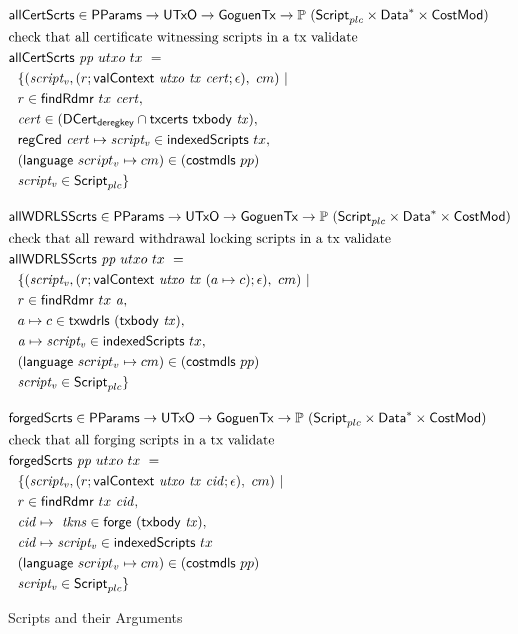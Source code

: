 \begin{figure}[htb]
  \begin{align*}
    & \fun{allCertScrts} \in \PParams \to \UTxO \to \GoguenTx \to \powerset{(\ScriptPlutus \times \seqof{\Data} \times \CostMod)} \\
    & \text{check that all certificate witnessing scripts in a tx validate} \\
    & \fun{allCertScrts}~\var{pp}~{utxo}~{tx}~=~ \\
    & ~~\{ (\var{script_v}, (r;
    \fun{valContext}~\var{utxo}~\var{tx}~\var{cert}; \epsilon),~cm) ~\vert \\
    & ~~r \in \fun{findRdmr}~{tx}~\var{cert}, \\
    & ~~\var{cert} \in (\DCertDeRegKey\cap\fun{txcerts}~\txbody{tx}), \\
    &~~\fun{regCred}~\var{cert}\mapsto \var{script_v}\in \fun{indexedScripts}~{tx}, \\
    &~~(\fun{language}~{script_v} \mapsto cm)\in(\fun{costmdls}~{pp}) \\
    & ~~\var{script_v} \in \ScriptPlutus
     \}
    \nextdef
    & \fun{allWDRLSScrts} \in \PParams \to \UTxO \to \GoguenTx \to \powerset{(\ScriptPlutus\times\seqof{\Data} \times \CostMod)} \\
    & \text{check that all reward withdrawal locking scripts in a tx validate} \\
    & \fun{allWDRLSScrts}~\var{pp}~{utxo}~{tx}~=~ \\
    & ~~\{ (\var{script_v}, (r; \fun{valContext}~\var{utxo}~\var{tx}~
      (a\mapsto c); \epsilon),~cm) ~\vert \\
    &~~ r\in \fun{findRdmr}~{tx}~\var{a}, \\
    & ~~a \mapsto c \in\fun{txwdrls}~(\txbody{tx}), \\
    & ~~\var{a}\mapsto \var{script_v}\in \fun{indexedScripts}~{tx}, \\
    &~~(\fun{language}~{script_v} \mapsto cm)\in(\fun{costmdls}~{pp}) \\
    & ~~ \var{script_v} \in \ScriptPlutus \}
    \nextdef
    & \fun{forgedScrts} \in \PParams \to \UTxO \to \GoguenTx \to \powerset{(\ScriptPlutus\times\seqof{\Data} \times \CostMod)} \\
    & \text{check that all forging scripts in a tx validate} \\
    & \fun{forgedScrts}~\var{pp}~{utxo}~{tx}~=~\\
    & ~~\{ (\var{script_v}, (r;
    \fun{valContext}~\var{utxo}~\var{tx}~\var{cid}; \epsilon),~cm) ~\vert \\
    & ~~r \in \fun{findRdmr}~{tx}~\var{cid}, \\
    & ~~\var{cid}\mapsto ~ \var{tkns} \in \fun{forge}~(\txbody{tx}), \\
    &~~\var{cid}\mapsto \var{script_v}\in \fun{indexedScripts}~{tx} \\
    &~~(\fun{language}~{script_v} \mapsto cm)\in(\fun{costmdls}~{pp}) \\
    & ~~ \var{script_v} \in \ScriptPlutus \}
  \end{align*}
  \caption{Scripts and their Arguments}
  \label{fig:functions:script2}
\end{figure}

